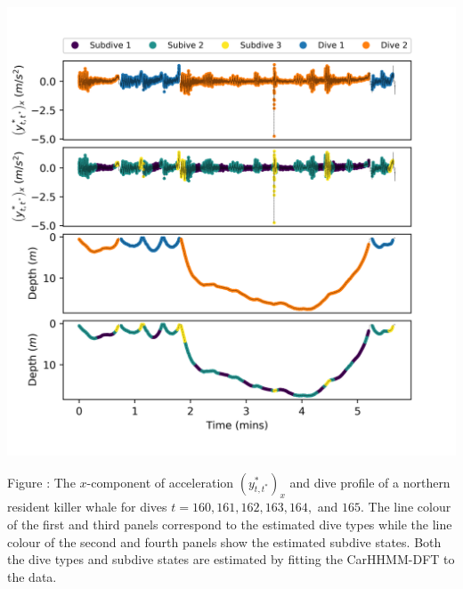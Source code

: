 \documentclass{article}
\begin{document}
        \begin{center}
        \includegraphics[width=6in]{../Plots/CarHHMM2_decoded_dives.png}
        \end{center}
        
        \noindent Figure : The $x$-component of acceleration $\left(y^*_{t,t^*}\right)_x$ and dive profile of a northern resident killer whale for dives $t = 160,161,162,163,164,$ and $165$. The line colour of the first and third panels correspond to the estimated dive types while the line colour of the second and fourth panels show the estimated subdive states. Both the dive types and subdive states are estimated by fitting the CarHHMM-DFT to the data.
        \addtocounter{fignum}{1}
        
\end{document}
